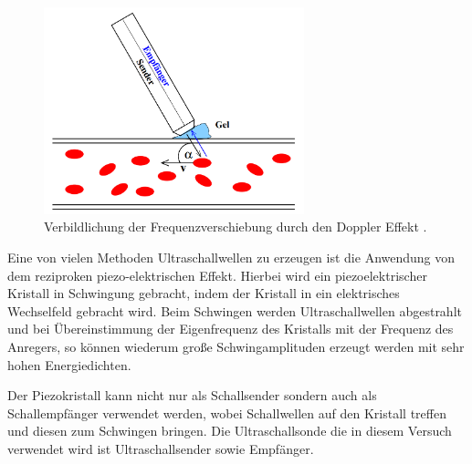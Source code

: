 \begin{figure}[H]       
    \centering
    \includegraphics[height=60mm]{bilder/Frequenzverschiebung.png}
    \caption{Verbildlichung der Frequenzverschiebung durch den Doppler Effekt \cite{a1}.\label{Abbildung1} }
\end{figure}

\begin{flushleft}
    Eine von vielen Methoden Ultraschallwellen zu erzeugen ist die Anwendung von dem reziproken piezo-elektrischen Effekt.
    Hierbei wird ein piezoelektrischer Kristall in Schwingung gebracht, indem der Kristall in ein elektrisches Wechselfeld gebracht wird.
    Beim Schwingen werden Ultraschallwellen abgestrahlt und bei Übereinstimmung der Eigenfrequenz des Kristalls mit der Frequenz des Anregers, so können wiederum große Schwingamplituden erzeugt werden mit sehr hohen Energiedichten.
\end{flushleft}

\begin{flushleft}
    Der Piezokristall kann nicht nur als Schallsender sondern auch als Schallempfänger verwendet werden, wobei Schallwellen auf den Kristall treffen und diesen zum Schwingen bringen.
    Die Ultraschallsonde die in diesem Versuch verwendet wird ist Ultraschallsender sowie Empfänger. 
\end{flushleft}